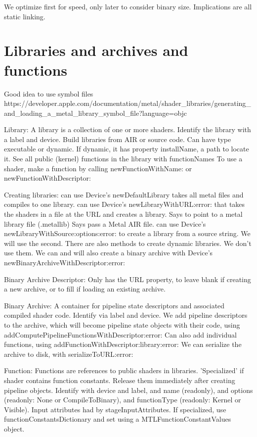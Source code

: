 
We optimize first for speed, only later to consider binary size.
Implications are all static linking.



\section{Libraries and archives and functions}


Good idea to use symbol files
https://developer.apple.com/documentation/metal/shader_libraries/generating_and_loading_a_metal_library_symbol_file?language=objc


Library:
A library is a collection of one or more shaders.
Identify the library with a label and device.
Build libraries from AIR or source code.
Can have type executable or dynamic. If dynamic, it has property installName, a path to locate it. 
See all public (kernel) functions in the library with functionNames
To use a shader, make a function by calling newFunctionWithName: or newFunctionWithDescriptor:

Creating libraries:
can use Device's newDefaultLibrary takes all metal files and compiles to one library.
can use Device's newLibraryWithURL:error: that takes the shaders in a file at the URL and creates a library.
    Says to point to a metal library file (.metallib)
    Says pass a Metal AIR file.
can use Device's newLibraryWithSource:options:error: to create a library from a source string.
We will use the second.
There are also methods to create dynamic libraries. We don't use them. 
We can and will also create a binary archive with Device's newBinaryArchiveWithDescriptor:error:

Binary Archive Descriptor:
Only has the URL property, to leave blank if creating a new archive, or to fill if loading an existing archive.

Binary Archive:
A container for pipeline state descriptors and associated compiled shader code.
Identify via label and device.
We add pipeline descriptors to the archive, which will become pipeline state objects with their code, using addComputePipelineFunctionsWithDescriptor:error:
Can also add individual functions, using addFunctionWithDescriptor:library:error:
We can serialize the archive to disk, with serializeToURL:error:

Function:
Functions are references to public shaders in libraries.
'Specialized' if shader contains function constants.
Release them immediately after creating pipeline objects.
Identify with device and label, and name (readonly), and options (readonly: None or CompileToBinary), and functionType (readonly: Kernel or Visible).
Input attributes had by stageInputAttributes.
If specialized, use functionConstantsDictionary and set using a MTLFunctionConstantValues object.

